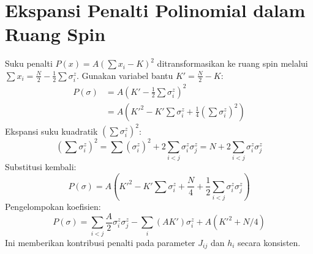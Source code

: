 \section{Ekspansi Penalti Polinomial dalam Ruang Spin}
Suku penalti $P(x) = A(\sum x_i - K)^2$ ditransformasikan ke ruang spin melalui $\sum x_i = \frac{N}{2} - \frac{1}{2}\sum \sigma_i^z$.
Gunakan variabel bantu $K' = \frac{N}{2} - K$:
\begin{equation}
\begin{aligned}
P(\sigma) &= A \left( K' - \frac{1}{2}\sum \sigma_i^z \right)^2 \\
&= A \left( K'^2 - K' \sum \sigma_i^z + \frac{1}{4} \left(\sum \sigma_i^z\right)^2 \right)
\end{aligned}
\end{equation}
Ekspansi suku kuadratik $\left(\sum \sigma_i^z\right)^2$:
\begin{equation}
\left(\sum \sigma_i^z\right)^2 = \sum (\sigma_i^z)^2 + 2\sum_{i<j} \sigma_i^z \sigma_j^z = N + 2\sum_{i<j} \sigma_i^z \sigma_j^z
\end{equation}
Substitusi kembali:
\begin{equation}
P(\sigma) = A \left( K'^2 - K' \sum \sigma_i^z + \frac{N}{4} + \frac{1}{2}\sum_{i<j} \sigma_i^z \sigma_j^z \right)
\end{equation}
Pengelompokan koefisien:
\begin{equation}
P(\sigma) = \sum_{i<j} \frac{A}{2} \sigma_i^z \sigma_j^z - \sum_i (A K') \sigma_i^z + A(K'^2 + N/4)
\end{equation}
Ini memberikan kontribusi penalti pada parameter $J_{ij}$ dan $h_i$ secara konsisten.
